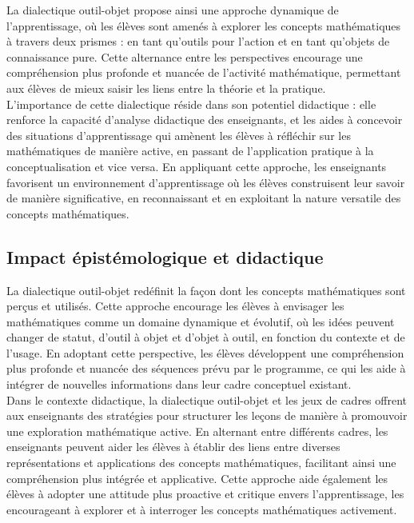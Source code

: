 La dialectique outil-objet propose ainsi une approche dynamique de l'apprentissage,
où les élèves sont amenés à explorer les concepts mathématiques à travers deux prismes :
en tant qu'outils pour l'action et en tant qu'objets de connaissance pure.
Cette alternance entre les perspectives encourage une compréhension plus profonde et nuancée de l'activité mathématique,
permettant aux élèves de mieux saisir les liens entre la théorie et la pratique.\\

L'importance de cette dialectique réside dans son potentiel didactique :
elle renforce la capacité d'analyse didactique des enseignants,
et les aides à concevoir des situations d'apprentissage qui amènent les élèves à réfléchir sur les mathématiques de manière active,
en passant de l'application pratique à la conceptualisation et vice versa.
En appliquant cette approche,
les enseignants favorisent un environnement d'apprentissage où les élèves construisent leur savoir de manière significative,
en reconnaissant et en exploitant la nature versatile des concepts mathématiques.

\subsection{Impact épistémologique et didactique}

La dialectique outil-objet redéfinit la façon dont les concepts mathématiques sont perçus et utilisés.
Cette approche encourage les élèves à envisager les mathématiques comme un domaine dynamique et évolutif,
où les idées peuvent changer de statut, d'outil à objet et d'objet à outil, en fonction du contexte et de l'usage.
En adoptant cette perspective,
les élèves développent une compréhension plus profonde et nuancée des séquences prévu par le programme,
ce qui les aide à intégrer de nouvelles informations dans leur cadre conceptuel existant.\\

Dans le contexte didactique,
la dialectique outil-objet et les jeux de cadres offrent aux enseignants des stratégies pour structurer les leçons de manière à promouvoir une exploration mathématique active.
En alternant entre différents cadres,
les enseignants peuvent aider les élèves à établir des liens entre diverses représentations et applications des concepts mathématiques,
facilitant ainsi une compréhension plus intégrée et applicative.
Cette approche aide également les élèves à adopter une attitude plus proactive et critique envers l'apprentissage,
les encourageant à explorer et à interroger les concepts mathématiques activement.

